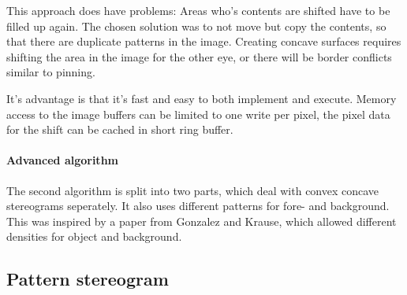 This approach does have problems: Areas who's contents are shifted have to be filled up again. The chosen solution was to not move but copy the contents, so that there are duplicate patterns in the image. Creating concave surfaces requires shifting the area in the image for the other eye, or there will be border conflicts similar to pinning.

It's advantage is that it's fast and easy to both implement and execute. Memory access to the image buffers can be limited to one write per pixel, the pixel data for the shift can be cached in short ring buffer.

\paragraph{Advanced algorithm}
The second algorithm is split into two parts, which deal with convex concave stereograms seperately. It also uses different patterns for fore- and background. This was inspired by a paper from Gonzalez and Krause\cite{GenRDS}, which allowed different densities for object and background.

\subsection{Pattern stereogram}
\paragraph{}
